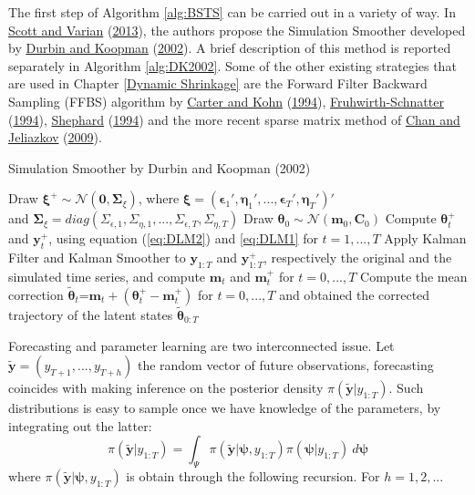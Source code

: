 \documentclass[
  12pt,
]{book}
\theoremstyle{break}
\theoremstyle{nonumberplain}
\begin{document}
The first step of Algorithm \ref{alg:BSTS} can be carried out in a
variety of way. In \protect\hyperlink{ref-scott_varian_2013}{Scott and
Varian} (\protect\hyperlink{ref-scott_varian_2013}{2013}), the authors
propose the Simulation Smoother developed by
\protect\hyperlink{ref-Durbin_K2002}{Durbin and Koopman}
(\protect\hyperlink{ref-Durbin_K2002}{2002}). A brief description of
this method is reported separately in Algorithm \ref{alg:DK2002}. Some
of the other existing strategies that are used in Chapter
\ref{Dynamic Shrinkage} are the Forward Filter Backward Sampling (FFBS)
algorithm by \protect\hyperlink{ref-CK_1994}{Carter and Kohn}
(\protect\hyperlink{ref-CK_1994}{1994}),
\protect\hyperlink{ref-fruhwirth-schnatter_1994}{Fruhwirth-Schnatter}
(\protect\hyperlink{ref-fruhwirth-schnatter_1994}{1994}),
\protect\hyperlink{ref-S_1994}{Shephard}
(\protect\hyperlink{ref-S_1994}{1994}) and the more recent sparse matrix
method of \protect\hyperlink{ref-chan_jeliazkov_2009}{Chan and
Jeliazkov} (\protect\hyperlink{ref-chan_jeliazkov_2009}{2009}).

\begin{algorithm}
\caption{Simulation Smoother by Durbin and Koopman (2002)} \label{alg:DK2002}
\nl Draw $\boldsymbol{\xi}^{+}\sim \mathcal{N}(\boldsymbol{0},\boldsymbol{\Sigma}_{\xi})$, where $\boldsymbol{\xi}=(\boldsymbol{\epsilon}_{1}',\boldsymbol{\eta}_{1}',...,\boldsymbol{\epsilon}_{T}',\boldsymbol{\eta}_{T}')'$ \\ and $\boldsymbol{\Sigma}_{\xi}=diag(\Sigma_{\epsilon,1},\Sigma_{\eta,1},...,\Sigma_{\epsilon,T},\Sigma_{\eta,T})$ \;
\nl Draw $\boldsymbol{\theta}_{0}\sim\mathcal{N}(\boldsymbol{m}_{0},\boldsymbol{C}_{0})$\;
\nl Compute $\boldsymbol{\theta}^{+}_{t}$ and $\boldsymbol{y}^{+}_{t}$, using equation (\ref{eq:DLM2}) and \ref{eq:DLM1} for $t=1,...,T$\;
\nl Apply Kalman Filter and Kalman Smoother to $\boldsymbol{y}_{1:T}$ and $\boldsymbol{y}_{1:T}^{+}$, respectively the original and the simulated time series, and compute $\boldsymbol{m}_{t}$ and $\boldsymbol{m}_{t}^{+}$ for $t=0,...,T$\;
\nl Compute the mean correction $\tilde{\boldsymbol{\theta}}_{t}$=$\boldsymbol{m}_{t}+(\boldsymbol{\theta}^{+}_{t}-\boldsymbol{m}_{t}^{+})$ for $t=0,...,T$ and obtained the corrected trajectory of the latent states $\tilde{\boldsymbol{\theta}}_{0:T}$\;
\end{algorithm}

Forecasting and parameter learning are two interconnected issue. Let
\(\boldsymbol{\tilde{y}}=(y_{T+1},...,y_{T+h})\) the random vector of
future observations, forecasting coincides with making inference on the
posterior density \(\pi(\boldsymbol{\tilde{y}}|y_{1:T})\). Such
distributions is easy to sample once we have knowledge of the
parameters, by integrating out the latter:
\begin{equation} \label{eq:postforecast}
\pi(\boldsymbol{\tilde{y}}|y_{1:T})=\int_{\Psi} \pi(\boldsymbol{\tilde{y}}|\boldsymbol{\psi},y_{1:T})\pi(\boldsymbol{\psi}|y_{1:T}) \ d\boldsymbol{\psi}
\end{equation} where
\(\pi(\boldsymbol{\tilde{y}}|\boldsymbol{\psi},y_{1:T})\) is obtain
through the following recursion. For \(h=1,2,...\)
\end{document}

